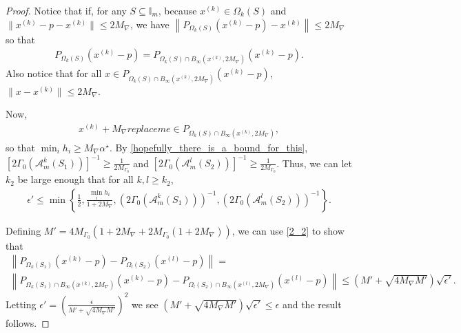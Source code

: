 \documentclass{article}
\theoremstyle{case}
\numberwithin{theorem}{subsection}
\newcommand{\huff}{{\Gamma_0}}
\newcommand{\maxgrad}{{M_{\nabla}}}
\newcommand{\minanglealpha}{{ \alpha^{\star} }}
\newcommand{\xk}{{x^{(k)}}}
\newcommand{\minangleu}{{replace me}}
\begin{document}
\begin{proof}
Notice that if, for any $S \subseteq \mathbb I_m$,
because $\xk \in \Omega_k(S)$ and $\|\xk - p - \xk\| \le 2\maxgrad $, we have
$\left\|P_{\Omega_k(S)}\left(\xk - p \right) - \xk \right\| \le 2\maxgrad$
so that 
\begin{align*}
P_{\Omega_k(S)                 							  }\left(\xk - p \right) = 
P_{\Omega_k(S) \cap B_{\infty}\left(\xk, 2\maxgrad\right) }\left(\xk - p\right).
\end{align*}
Also notice that for all $x \in P_{\Omega_k(S) \cap B_{\infty}\left(\xk, 2\maxgrad\right) }\left(\xk - p\right)$,
$\|x - \xk\| \le 2\maxgrad$.

Now, 
\begin{align*}
\xk + \maxgrad \minangleu \in P_{\Omega_k(S) \cap B_{\infty}\left(\xk, 2\maxgrad\right) },
\end{align*}
so that $\min_i h_i \ge \maxgrad \minanglealpha$.
By \cref{hopefully_there_is_a_bound_for_this},
$\left[2\huff\left(\mathcal A^k_m\left(S_1\right)\right)\right]^{-1} \ge \frac 1 {2M_{\Gamma_0}}$ and
$\left[2\huff\left(\mathcal A^l_m\left(S_2\right)\right)\right]^{-1} \ge \frac 1 {2M_{\Gamma_0}}$.
Thus, we can let $k_2$ be large enough that for all $k, l \ge k_2$,
\begin{align*}
\epsilon' \le \min\left\{
\frac 1 2,
\frac{\min_i h_i}{1 + 2\maxgrad},
\left(2\huff\left(\mathcal A^k_m\left(S_1\right)\right)\right)^{-1},
\left(2\huff\left(\mathcal A^l_m\left(S_2\right)\right)\right)^{-1}\right\}.
\end{align*}

Defining $M' = 4M_{\Gamma_0}\left(1 + 2\maxgrad + 2M_{\Gamma_0}\left(1 + 2\maxgrad\right)\right)$, 
we can use \cref{2_2} to show that
\begin{align*}
\left\| 
  P_{\Omega_k(S_1)}\left(\xk - p\right) - P_{\Omega_l(S_2)}\left(x^{(l)} - p \right)
\right\| = \\
\left\| 
  P_{\Omega_k(S_1) \cap B_{\infty}\left(\xk, 2\maxgrad\right)}\left(\xk - p\right) - P_{\Omega_l(S_2) \cap B_{\infty}\left(x^{(l)}, 2\maxgrad\right)}\left(x^{(l)} - p \right)
\right\| \le \left( M' + \sqrt{4\maxgrad M'}\right)\sqrt{\epsilon'}.
\end{align*}
Letting 
$\epsilon' = \left(\frac{\epsilon}{ M' + \sqrt{4\maxgrad M'}}\right)^2$
we see
$ \left( M' + \sqrt{4\maxgrad M'}\right)\sqrt{\epsilon'} \le \epsilon$
and the result follows.
\end{proof}
\end{document}
